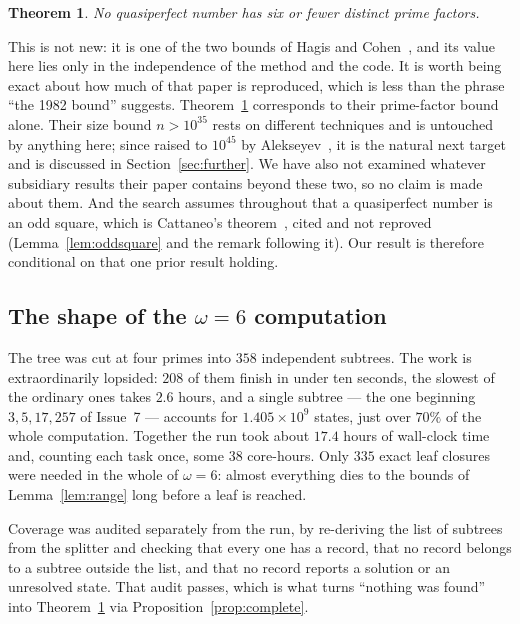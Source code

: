 \documentclass[11pt]{amsart}
\newtheorem{theorem}{Theorem}
\theoremstyle{remark}
\begin{document}
\begin{theorem}\label{thm:main}
No quasiperfect number has six or fewer distinct prime factors.
\end{theorem}

This is not new: it is one of the two bounds of Hagis and
Cohen~\cite{hagiscohen}, and its value here lies only in the independence of the
method and the code. It is worth being exact about how much of that paper is
reproduced, which is less than the phrase ``the 1982 bound'' suggests.
Theorem~\ref{thm:main} corresponds to their prime-factor bound alone. Their size
bound $n > 10^{35}$ rests on different techniques and is untouched by anything
here; since raised to $10^{45}$ by Alekseyev~\cite{alekseyev}, it is the natural
next target and is discussed in Section~\ref{sec:further}. We have also not
examined whatever subsidiary results their paper contains beyond these two, so
no claim is made about them. And the search assumes throughout that a
quasiperfect number is an odd square, which is Cattaneo's
theorem~\cite{cattaneo}, cited and not reproved
(Lemma~\ref{lem:oddsquare} and the remark following it). Our result is therefore
conditional on that one prior result holding.

\subsection{The shape of the $\omega = 6$ computation}
The tree was cut at four primes into $358$ independent subtrees. The work is
extraordinarily lopsided: $208$ of them finish in under ten seconds, the
slowest of the ordinary ones takes $2.6$ hours, and a single subtree ---
the one beginning $3, 5, 17, 257$ of Issue~7 --- accounts for
$1.405 \times 10^{9}$ states, just over $70\%$ of the whole computation.
Together the run took about $17.4$ hours of wall-clock time and, counting each
task once, some $38$ core-hours. Only $335$ exact leaf closures were needed in
the whole of $\omega = 6$: almost everything dies to the bounds of
Lemma~\ref{lem:range} long before a leaf is reached.

Coverage was audited separately from the run, by re-deriving the list of
subtrees from the splitter and checking that every one has a record, that no
record belongs to a subtree outside the list, and that no record reports a
solution or an unresolved state. That audit passes, which is what turns
``nothing was found'' into Theorem~\ref{thm:main} via
Proposition~\ref{prop:complete}.
\end{document}
